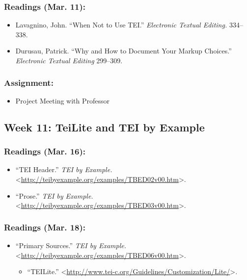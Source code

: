 \documentclass[]{article}
\begin{document}
\subsubsection{Readings (Mar. 11):}\label{readings-mar.-11}

\begin{itemize}
\itemsep1pt\parskip0pt
\item
  Lavagnino, John. ``When Not to Use TEI.'' \emph{Electronic Textual
  Editing.} 334--338.
\item
  Durusau, Patrick. ``Why and How to Document Your Markup Choices.''
  \emph{Electronic Textual Editing} 299--309.
\end{itemize}

\subsubsection{Assignment:}\label{assignment}

\begin{itemize}
\itemsep1pt\parskip0pt
\item
  Project Meeting with Professor
\end{itemize}

\subsection{Week 11: TeiLite and TEI by
Example}\label{week-11-teilite-and-tei-by-example}

\subsubsection{Readings (Mar. 16):}\label{readings-mar.-16}

\begin{itemize}
\itemsep1pt\parskip0pt
\item
  ``TEI Header.'' \emph{TEI by Example.}
  \textless{}\url{http://teibyexample.org/examples/TBED02v00.htm}\textgreater{}.
\item
  ``Prose.'' \emph{TEI by Example.}
  \textless{}\url{http://teibyexample.org/examples/TBED03v00.htm}\textgreater{}.
\end{itemize}

\subsubsection{Readings (Mar. 18):}\label{readings-mar.-18}

\begin{itemize}
\itemsep1pt\parskip0pt
\item
  ``Primary Sources.'' \emph{TEI by Example.}
  \textless{}\url{http://teibyexample.org/examples/TBED06v00.htm}\textgreater{}.

  \begin{itemize}
  \itemsep1pt\parskip0pt
  \item
    ``TEILite.''
    \textless{}\url{http://www.tei-c.org/Guidelines/Customization/Lite/}\textgreater{}.
  \end{itemize}
\end{itemize}
\end{document}

